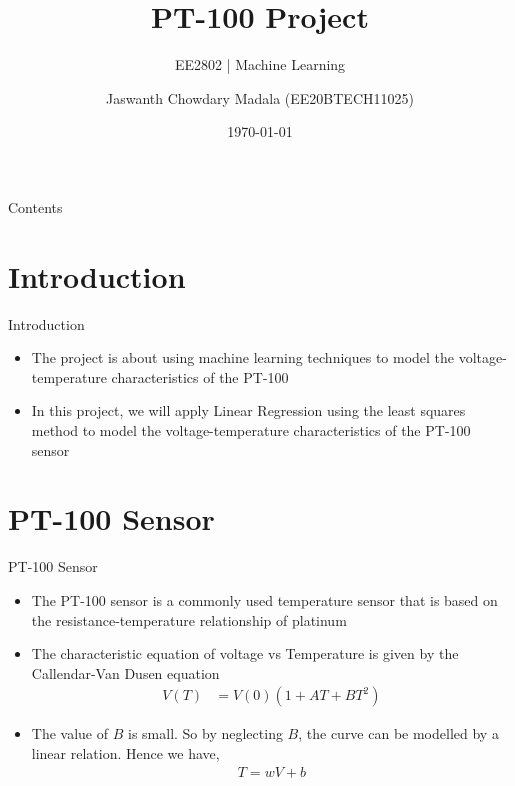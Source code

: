 \documentclass[10pt]{beamer}
\title{PT-100 Project}
\subtitle{EE2802 | Machine Learning}
\author[Jaswanth]{Jaswanth Chowdary Madala (EE20BTECH11025)}
\institute{IIT Hyderabad}
\date{\today}
\renewcommand{\vec}[1]{\boldsymbol{\mathbf{#1}}}
\newcommand{\myvec}[1]{\ensuremath{\begin{pmatrix}#1\end{pmatrix}}}
\providecommand{\brak}[1]{\ensuremath{\left(#1\right)}}
\begin{document}
\maketitle

\begin{frame}{Contents}
    \tableofcontents
\end{frame}


\section{Introduction}
\begin{frame}{Introduction}
    \begin{itemize}
    \item  The project is about using machine learning techniques to model the voltage-temperature characteristics of the PT-100 \vspace{0.25cm}
    \item In this project, we will apply Linear Regression using the least squares method to model the voltage-temperature characteristics of the PT-100 sensor 
    \end{itemize} 
\end{frame}


\section{PT-100 Sensor}
\begin{frame}{PT-100 Sensor}
	\begin{itemize}
	\item The PT-100 sensor is a commonly used temperature sensor that is based on the resistance-temperature relationship of platinum \vspace{0.25cm}
	\item The characteristic equation of voltage vs Temperature is given by the Callendar-Van Dusen equation
\begin{align}
    V(T) &= V(0)\brak{1+AT+BT^2}
\end{align}
	\item The value of $B$ is small. So by neglecting $B$, the curve can be modelled by a linear relation. Hence we have,
	\begin{align}
		T = wV + b
	\end{align}
	\end{itemize}
\end{frame}
\end{document}
